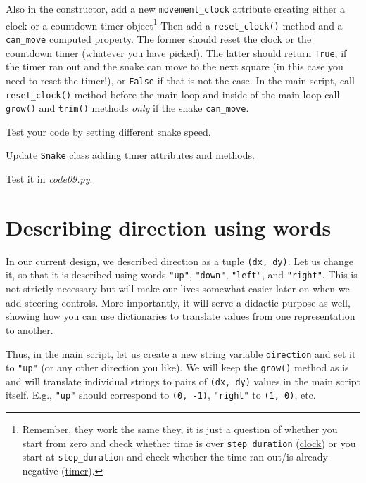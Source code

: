 \documentclass[
]{book}
\begin{document}
Also in the constructor, add a new \texttt{movement\_clock} attribute creating either a \href{https://www.psychopy.org/api/clock.html\#psychopy.clock.Clock}{clock} or a \href{https://www.psychopy.org/api/clock.html\#psychopy.clock.CountdownTimer}{countdown timer} object\footnote{Remember, they work the same they, it is just a question of whether you start from zero and check whether time is over \texttt{step\_duration} (\href{https://www.psychopy.org/api/clock.html\#psychopy.clock.Clock}{clock}) or you start at \texttt{step\_duration} and check whether the time ran out/is already negative (\href{https://www.psychopy.org/api/clock.html\#psychopy.clock.CountdownTimer}{timer}).} Then add a \texttt{reset\_clock()} method and a \texttt{can\_move} computed \protect\hyperlink{computed-attribute-property}{property}. The former should reset the clock or the countdown timer (whatever you have picked). The latter should return \texttt{True}, if the timer ran out and the snake can move to the next square (in this case you need to reset the timer!), or \texttt{False} if that is not the case. In the main script, call \texttt{reset\_clock()} method before the main loop and inside of the main loop call \texttt{grow()} and \texttt{trim()} methods \emph{only} if the snake \texttt{can\_move}.

Test your code by setting different snake speed.

Update \texttt{Snake} class adding timer attributes and methods.

Test it in \emph{code09.py}.

\hypertarget{describing-direction-using-words}{%
\section{Describing direction using words}\label{describing-direction-using-words}}

In our current design, we described direction as a tuple \texttt{(dx,\ dy)}. Let us change it, so that it is described using words \texttt{"up"}, \texttt{"down"}, \texttt{"left"}, and \texttt{"right"}. This is not strictly necessary but will make our lives somewhat easier later on when we add steering controls. More importantly, it will serve a didactic purpose as well, showing how you can use dictionaries to translate values from one representation to another.

Thus, in the main script, let us create a new string variable \texttt{direction} and set it to \texttt{"up"} (or any other direction you like). We will keep the \texttt{grow()} method as is and will translate individual strings to pairs of \texttt{(dx,\ dy)} values in the main script itself. E.g., \texttt{"up"} should correspond to \texttt{(0,\ -1)}, \texttt{"right"} to \texttt{(1,\ 0)}, etc.
\end{document}
